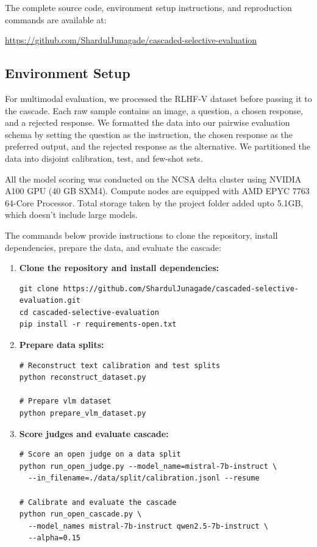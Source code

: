 \documentclass[11pt,a4paper]{article}
\begin{document}
The complete source code, environment setup instructions, and reproduction
commands are available at:

\begin{center}
\url{https://github.com/ShardulJunagade/cascaded-selective-evaluation}
\end{center}
\subsection{Environment Setup}

For multimodal evaluation, we processed the RLHF-V dataset before passing it to the cascade. Each raw sample contains an image, a question, a chosen response, and a rejected response. We formatted the data into our pairwise evaluation schema by setting the question as the instruction, the chosen response as the preferred output, and the rejected response as the alternative. We partitioned the data into disjoint calibration, test, and few-shot sets.

All the model scoring was conducted on the NCSA delta cluster using NVIDIA A100 GPU (40 GB SXM4). Compute nodes are equipped with AMD EPYC 7763 64-Core Processor. Total storage taken by the project folder added upto 5.1GB, which doesn't include large models.

The commands below provide instructions to clone the repository, install dependencies, prepare the data, and evaluate the cascade:

\begin{enumerate}[leftmargin=*]
    \item \textbf{Clone the repository and install dependencies:}
\begin{verbatim}
git clone https://github.com/ShardulJunagade/cascaded-selective-evaluation.git
cd cascaded-selective-evaluation
pip install -r requirements-open.txt
\end{verbatim}

    \item \textbf{Prepare data splits:}
\begin{verbatim}
# Reconstruct text calibration and test splits
python reconstruct_dataset.py

# Prepare vlm dataset
python prepare_vlm_dataset.py
\end{verbatim}

    \item \textbf{Score judges and evaluate cascade:}
\begin{verbatim}
# Score an open judge on a data split
python run_open_judge.py --model_name=mistral-7b-instruct \
  --in_filename=./data/split/calibration.jsonl --resume

# Calibrate and evaluate the cascade
python run_open_cascade.py \
  --model_names mistral-7b-instruct qwen2.5-7b-instruct \
  --alpha=0.15
\end{verbatim}
\end{enumerate}
\end{document}

